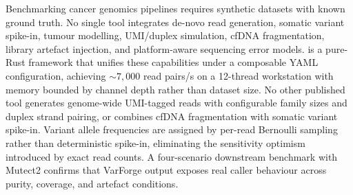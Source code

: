 Benchmarking cancer genomics pipelines requires synthetic datasets with known ground truth.
No single tool integrates de-novo read generation, somatic variant spike-in, tumour modelling, UMI/duplex simulation, cfDNA fragmentation, library artefact injection, and platform-aware sequencing error models.
\varforge{} is a pure-Rust framework that unifies these capabilities under a composable YAML configuration, achieving ${\sim}7{,}000$ read pairs/s on a 12-thread workstation with memory bounded by channel depth rather than dataset size.
No other published tool generates genome-wide UMI-tagged reads with configurable family sizes and duplex strand pairing, or combines cfDNA fragmentation with somatic variant spike-in.
Variant allele frequencies are assigned by per-read Bernoulli sampling rather than deterministic spike-in, eliminating the sensitivity optimism introduced by exact read counts.
A four-scenario downstream benchmark with Mutect2 confirms that VarForge output exposes real caller behaviour across purity, coverage, and artefact conditions.
